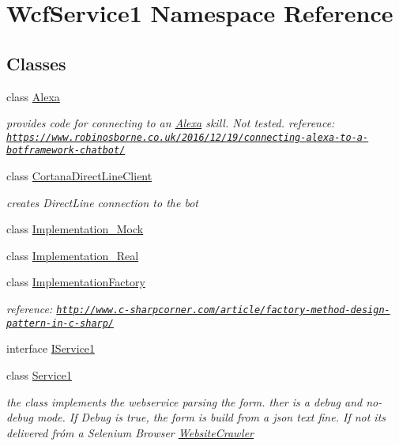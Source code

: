 \hypertarget{namespace_wcf_service1}{}\section{Wcf\+Service1 Namespace Reference}
\label{namespace_wcf_service1}
\subsection*{Classes}
\begin{DoxyCompactItemize}
\item 
class \hyperlink{class_wcf_service1_1_1_alexa}{Alexa}
\begin{DoxyCompactList}\small\item\em provides code for connecting to an \hyperlink{class_wcf_service1_1_1_alexa}{Alexa} skill. Not tested. reference\+: \href{https://www.robinosborne.co.uk/2016/12/19/connecting-alexa-to-a-botframework-chatbot/}{\tt https\+://www.\+robinosborne.\+co.\+uk/2016/12/19/connecting-\/alexa-\/to-\/a-\/botframework-\/chatbot/} \end{DoxyCompactList}\item 
class \hyperlink{class_wcf_service1_1_1_cortana_direct_line_client}{Cortana\+Direct\+Line\+Client}
\begin{DoxyCompactList}\small\item\em creates Direct\+Line connection to the bot \end{DoxyCompactList}\item 
class \hyperlink{class_wcf_service1_1_1_implementation___mock}{Implementation\+\_\+\+Mock}
\item 
class \hyperlink{class_wcf_service1_1_1_implementation___real}{Implementation\+\_\+\+Real}
\item 
class \hyperlink{class_wcf_service1_1_1_implementation_factory}{Implementation\+Factory}
\begin{DoxyCompactList}\small\item\em reference\+: \href{http://www.c-sharpcorner.com/article/factory-method-design-pattern-in-c-sharp/}{\tt http\+://www.\+c-\/sharpcorner.\+com/article/factory-\/method-\/design-\/pattern-\/in-\/c-\/sharp/} \end{DoxyCompactList}\item 
interface \hyperlink{interface_wcf_service1_1_1_i_service1}{I\+Service1}
\item 
class \hyperlink{class_wcf_service1_1_1_service1}{Service1}
\begin{DoxyCompactList}\small\item\em the class implements the webservice parsing the form. ther is a debug and no-\/debug mode. If Debug is true, the form is build from a json text fine. If not it\textquotesingle{}s delivered fróm a Selenium Browser \hyperlink{class_wcf_service1_1_1_website_crawler}{Website\+Crawler} \end{DoxyCompactList}\item 

\end{DoxyCompactItemize}
